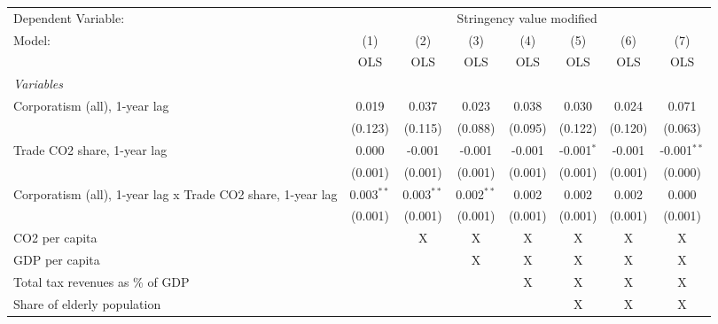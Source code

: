 
\begingroup
\centering
\begin{tabular}{lccccccc}
   \toprule
   Dependent Variable: & \multicolumn{7}{c}{Stringency value modified}\\
   Model:                                                      & (1)          & (2)          & (3)          & (4)     & (5)          & (6)     & (7)\\  
                                                               &  OLS         & OLS          & OLS          & OLS     & OLS          & OLS     & OLS\\  
   \midrule
   \emph{Variables}\\
   Corporatism (all), 1-year lag                               & 0.019        & 0.037        & 0.023        & 0.038   & 0.030        & 0.024   & 0.071\\   
                                                               & (0.123)      & (0.115)      & (0.088)      & (0.095) & (0.122)      & (0.120) & (0.063)\\   
   Trade CO2 share, 1-year lag                                 & 0.000        & -0.001       & -0.001       & -0.001  & -0.001$^{*}$ & -0.001  & -0.001$^{**}$\\   
                                                               & (0.001)      & (0.001)      & (0.001)      & (0.001) & (0.001)      & (0.001) & (0.000)\\   
   Corporatism (all), 1-year lag x Trade CO2 share, 1-year lag & 0.003$^{**}$ & 0.003$^{**}$ & 0.002$^{**}$ & 0.002   & 0.002        & 0.002   & 0.000\\   
                                                               & (0.001)      & (0.001)      & (0.001)      & (0.001) & (0.001)      & (0.001) & (0.001)\\   
   CO2 per capita                                              &              & X            & X            & X       & X            & X       & X\\  
   GDP per capita                                              &              &              & X            & X       & X            & X       & X\\  
   Total tax revenues as \% of GDP                             &              &              &              & X       & X            & X       & X\\  
   Share of elderly population                                 &              &              &              &         & X            & X       & X\\  

\end{tabular}
